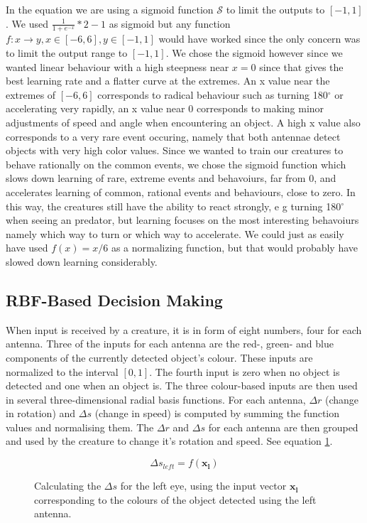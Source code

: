 \documentclass[a4paper,11pt]{kth-mag}
\begin{document}
In the equation we are using a sigmoid function $\mathcal{S}$ to limit the outputs to $[-1,1]$. We used $\frac{1}{1+e^{-x}} * 2 -1$ as sigmoid but any function $f:x\rightarrow y, x\in [-6,6], y \in [-1,1]$ would have worked since the only concern was to limit the output range to $[-1,1]$. We chose the sigmoid however since we wanted linear behaviour with a high steepness near $x=0$ since that gives the best learning rate and a flatter curve at the extremes. An x value near the extremes of $[-6,6]$ corresponds to radical behaviour such as turning 180$^\circ$ or accelerating very rapidly, an x value near 0 corresponds to making minor adjustments of speed and angle when encountering an object. A high x value also corresponds to a very rare event occuring, namely that both antennae detect objects with very high color values. Since we wanted to train our creatures to behave rationally on the common events, we chose the sigmoid function which slows down learning of rare, extreme events and behavoiurs, far from 0, and accelerates learning of common, rational events and behaviours, close to zero. In this way, the creatures still have the ability to react strongly, e g turning 180$^\circ$ when seeing an predator, but learning focuses on the most interesting behavoiurs namely which way to turn or which way to accelerate. We could just as easily have used $f(x) = x/6$ as a normalizing function, but that would probably have slowed down learning considerably.


\subsection{RBF-Based Decision Making}

When input is received by a creature, it is in form of eight numbers, four for each antenna. Three of the inputs for each antenna are the red-, green- and blue components of the currently detected object's colour. These inputs are normalized to the interval $[0,1]$. The fourth input is zero when no object is detected and one when an object is. The three colour-based inputs are then used in several three-dimensional radial basis functions. For each antenna, $\Delta r$ (change in rotation) and $\Delta s$ (change in speed) is computed by summing the function values and normalising them. The $\Delta r$ and $\Delta s$ for each antenna are then grouped and used by the creature to change it's rotation and speed. See equation \ref{RBF_decide}.

\begin{figure}
\begin{equation}
\Delta s _{left} = f(\mathbf{x_{l}})
\end{equation}
\caption{Calculating the $\Delta s$ for the left eye, using the input vector $\mathbf{x_{l}}$ corresponding to the colours of the object detected using the left antenna.\label{RBF_decide}}
\end{figure}
\end{document}

